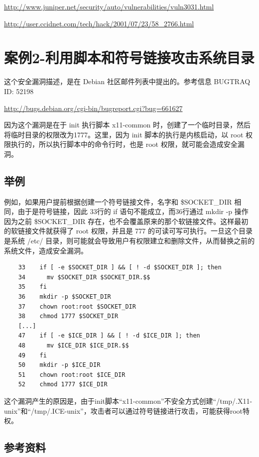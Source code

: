 \url{http://www.juniper.net/security/auto/vulnerabilities/vuln3031.html}

\url{http://user.ccidnet.com/tech/hack/2001/07/23/58_2766.html}

\section{案例2-利用脚本和符号链接攻击系统目录}

这个安全漏洞描述，是在 Debian 社区邮件列表中提出的。参考信息 BUGTRAQ ID:
52198

\url{http://bugs.debian.org/cgi-bin/bugreport.cgi?bug=661627}

因为这个漏洞是在于 init 执行脚本 x11-common
时，创建了一个临时目录，然后将临时目录的权限改为1777。这里，因为 init
脚本的执行是内核启动，以 root 权限执行的，所以执行脚本中的命令行时，也是
root 权限，就可能会造成安全漏洞。

\subsection{举例}

例如，如果用户提前根据创建一个符号链接文件，名字和 \$SOCKET\_DIR
相同，由于是符号链接，因此 33行的 if 语句不能成立，而36行通过 mkdir -p
操作因为之前 \$SOCKET\_DIR
存在，也不会覆盖原来的那个软链接文件。这样最初的软链接文件就获得了 root
权限，并且是 777 的可读可写可执行。一旦这个目录是系统 /etc/
目录，则可能就会导致用户有权限建立和删除文件，从而替换之前的系统文件，造成安全漏洞。

{\begin{shaded}\begin{verbatim}
    33    if [ -e $SOCKET_DIR ] && [ ! -d $SOCKET_DIR ]; then
    34      mv $SOCKET_DIR $SOCKET_DIR.$$
    35    fi
    36    mkdir -p $SOCKET_DIR
    37    chown root:root $SOCKET_DIR
    38    chmod 1777 $SOCKET_DIR
    [...]
    47    if [ -e $ICE_DIR ] && [ ! -d $ICE_DIR ]; then
    48      mv $ICE_DIR $ICE_DIR.$$
    49    fi
    50    mkdir -p $ICE_DIR
    51    chown root:root $ICE_DIR
    52    chmod 1777 $ICE_DIR
\end{verbatim}\end{shaded}}
这个漏洞产生的原因是，由于init脚本``x11-common''不安全方式创建``/tmp/.X11-unix''和``/tmp/.ICE-unix''，攻击者可以通过符号链接进行攻击，可能获得root特权。

\subsection{参考资料}

